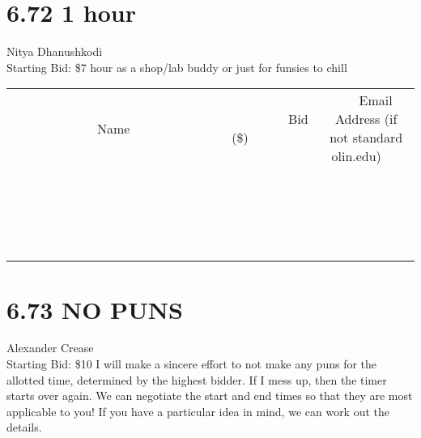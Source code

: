 \documentclass[11pt]{article}
\begin{document}
\section*{6.72 1 hour}
Nitya Dhanushkodi
\\
Starting Bid: \$7
 hour as a shop/lab buddy or just for funsies to chill
\\[3ex]
\begin{tabular}{c c c}
~~~~~~~~~~~~~Name~~~~~~~~~~~~~ & ~~~~~~~~~Bid (\$)~~~~~~~~~  & ~~~Email Address (if not standard olin.edu)~~~\\
 & & \\
\hline
 & & \\
\hline
 & & \\
\hline
 & & \\
\hline
 & & \\
\hline
 & & \\
\hline
 & & \\
\hline
 & & \\
\hline
 & & \\
\hline
 & & \\
\hline
 & & \\
\hline
 & & \\
\hline
 & & \\
\hline
 & & \\
\hline
 & & \\
\hline
 & & \\
\hline
 & & \\
\hline
 & & \\
\hline
 & & \\
\hline
\end{tabular}
\newpage
\section*{6.73 NO PUNS}
Alexander Crease
\\
Starting Bid: \$10
\newline
I will make a sincere effort to not make any puns for the allotted time, determined by the highest bidder. If I mess up, then the timer starts over again. We can negotiate the start and end times so that they are most applicable to you! If you have a particular idea in mind, we can work out the details.
\end{document}
